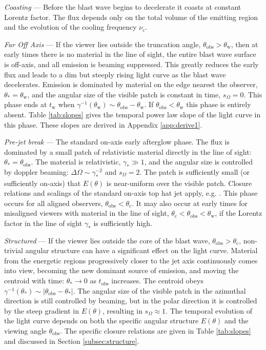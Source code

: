 \documentclass[twocolumn]{aastex62}
\newcommand{\tobs}{\ensuremath{t_{\mathrm{obs}}}}
\newcommand{\tW}{\ensuremath{t_{\mathrm{w}}}}
\newcommand{\thobs}{\ensuremath{\theta_{\mathrm{obs}}}}
\newcommand{\thW}{\ensuremath{\theta_{\mathrm{w}}}}
\newcommand{\thC}{\ensuremath{\theta_{\mathrm{c}}}}
\newcommand{\som}{\ensuremath{s_{\Omega}}}
\begin{document}
\emph{Coasting} --- Before the blast wave begins to decelerate it coasts at constant Lorentz factor. The flux depends only on the total volume of the emitting region and the evolution of the cooling frequency $\nu_c$. 

\emph{Far Off Axis} --- If the viewer lies outside the truncation angle, $\thobs > \thW$, then at early times there is no material in the line of sight, the entire blast wave surface is off-axis, and all emission is beaming suppressed.  This greatly reduces the early flux and leads to a dim but steeply rising light curve as the blast wave decelerates.  Emission is dominated by material on the edge nearest the observer, $\theta_* = \thW$, and the angular size of the visible patch is constant in time, $\som = 0$.  This phase ends at $\tW$ when $\gamma^{-1}(\thW) \sim \thobs-\thW$.  If $\thobs < \thW$ this phase is entirely absent.  Table \ref{tab:slopes} gives the temporal power law slope of the light curve in this phase.  These slopes are derived in Appendix \ref{app:derive1}.

\emph{Pre-jet break} --- The standard on-axis early afterglow phase.  The flux is dominated by a small patch of relativistic material directly in the line of sight: $\theta_* = \thobs$.  The material is relativistic, $\gamma_* \gg 1$, and the angular size is controlled by doppler beaming: $\Delta \Omega \sim \gamma_*^{-2}$ and $\som = 2$.  The patch is sufficiently small (or sufficiently on-axis) that $E(\theta)$ is near-uniform over the visible patch.  Closure relations and scalings of the standard on-axis top hat jet apply, e.g. \citet{Granot:2002aa}.  This phase occurs for all aligned observers, $\thobs < \thC$.  It may also occur at early times for misaligned viewers with material in the line of sight, $\thC < \thobs < \thW$, if the Lorentz factor in the line of sight $\gamma_*$ is sufficiently high.


\emph{Structured} --- If the viewer lies outside the core of the blast wave, $\thobs > \thC$, non-trivial angular structure can have a significant effect on the light curve.  Material from the energetic regions progressively closer to the jet axis continuously comes into view, becoming the new dominant source of emission, and moving the centroid with time: $\theta_* \to 0$ as $\tobs$ increases.  The centroid obeys $\gamma^{-1}(\theta_*) \sim |\thobs-\theta_*|$.  The angular size of the visible patch in the azimuthal direction is still controlled by beaming, but in the polar direction it is controlled by the steep gradient in $E(\theta)$, resulting in $\som \approx 1$.  The temporal evolution of the light curve depends on both the specific angular structure $E(\theta)$ and the viewing angle $\thobs$. The specific closure relations are given in Table \ref{tab:slopes} and discussed in Section \ref{subsec:structure}.
\end{document}
